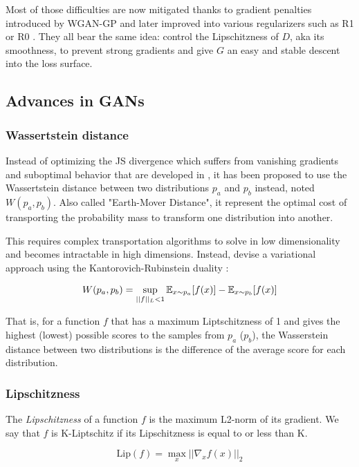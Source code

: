 Most of those difficulties are now mitigated thanks to gradient penalties introduced by \ac{WGAN-GP} \citep{wgangp} and later improved into various regularizers such as R1 \citep{R1} or R0 \citep{0-GP}. They all bear the same idea: control the Lipschitzness of $D$, aka its smoothness, to prevent strong gradients and give $G$ an easy and stable descent into the loss surface.

\subsection{Advances in \acp{GAN}}

\subsubsection{Wassertstein distance}

Instead of optimizing the \ac{JS} divergence which suffers from vanishing gradients and suboptimal behavior that are developed in \citet{wgan}, it has been proposed to use the Wassertstein distance between two distributions $p_a$ and $p_b$ instead, noted $W(p_a, p_b)$. Also called "Earth-Mover Distance", it represent the optimal cost of transporting the probability mass to transform one distribution into another.

This requires complex transportation algorithms to solve in low dimensionality and becomes intractable in high dimensions. Instead, \citet{wgan} devise a variational approach using the Kantorovich-Rubinstein duality \citep{kantorovich}:

\begin{equation}
    W(p_a, p_b) = \sup_{||f||_L < 1} \mathbb{E}_{x \sim p_a}[f(x)] - \mathbb{E}_{x \sim p_b}[f(x)]
\end{equation}

That is, for a function $f$ that has a maximum Liptschitzness of 1 and gives the highest (lowest) possible scores to the samples from $p_a$ ($p_b$), the Wasserstein distance between two distributions is the difference of the average score for each distribution.

\subsubsection{Lipschitzness}
The \emph{Lipschitzness} of a function $f$ is the maximum L2-norm of its gradient. We say that $f$ is K-Liptschitz if its Lipschitzness is equal to or less than K.

\begin{equation}
    \text{Lip}(f) = \max_x ||\nabla_x f(x)||_2
\end{equation}

